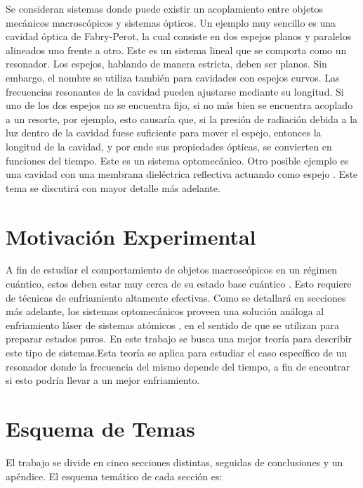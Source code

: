 \documentclass[a4paper,10pt]{report}
\begin{document}
Se consideran sistemas donde puede existir un acoplamiento entre objetos mecánicos macroscópicos y sistemas ópticos. Un ejemplo muy sencillo es una cavidad óptica de Fabry-Perot, la cual consiste en dos espejos planos y paralelos alineados uno frente a otro. Este es un sistema lineal que se comporta como un resonador. Los espejos, hablando de manera estricta, deben ser planos. Sin embargo, el nombre se utiliza también para cavidades con espejos curvos\cite{PaschottaFP}. Las frecuencias resonantes de la cavidad pueden ajustarse mediante su longitud. Si uno de los dos espejos no se encuentra fijo, si no más bien se encuentra acoplado a un resorte, por ejemplo, esto causaría que, si la presión de radiación debida a la luz dentro de la cavidad fuese suficiente para mover el espejo, entonces la longitud de la cavidad, y por ende sus propiedades ópticas, se convierten en funciones del tiempo. Este es un sistema optomecánico. Otro posible ejemplo es una cavidad con una membrana dieléctrica reflectiva actuando como espejo \cite{JockelMR}. Este tema se discutirá con mayor detalle más adelante.

\section{Motivación Experimental}

A fin de estudiar el comportamiento de objetos macroscópicos en un régimen cuántico, estos deben estar muy cerca de su estado base cuántico \cite{ChanQM}. Esto requiere de técnicas de enfriamiento altamente efectivas. Como se detallará en secciones más adelante, los sistemas optomecánicos proveen una solución análoga al enfriamiento láser de sistemas atómicos \cite{NooshiLC}, en el sentido de que se utilizan para preparar estados puros. En este trabajo se busca una mejor teoría para describir este tipo de sistemas.Esta teoría se aplica para estudiar el caso específico de un resonador donde la frecuencia del mismo depende del tiempo, a fin de encontrar si esto podría llevar a un mejor enfriamiento.
 

\section{Esquema de Temas}

El trabajo se divide en cinco secciones distintas, seguidas de conclusiones y un apéndice. El esquema temático de cada sección es:
\end{document}
